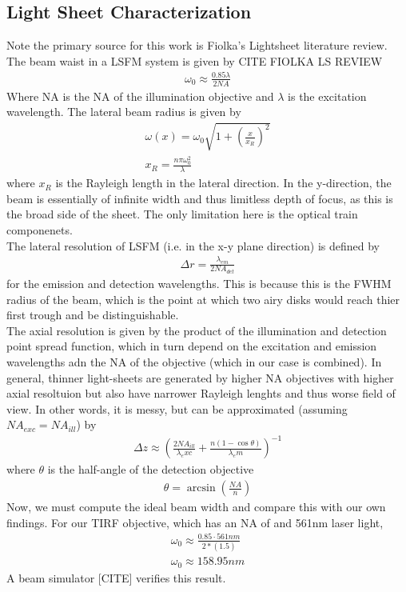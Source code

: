 \subsection{Light Sheet Characterization} %
Note the primary source for this work is Fiolka's Lightsheet literature review. The beam waist in a LSFM system is given by {CITE FIOLKA LS REVIEW} 
\begin{gather}
    \omega_0 \approx \frac{0.85 \lambda}{2 NA}
\end{gather}
    Where NA is the NA of the illumination objective and $\lambda$ is the excitation wavelength. The lateral beam radius is given by 
    \begin{gather}
        \omega(x) = \omega_0 \sqrt{1 + \left(\frac{x}{x_R}\right)^2}\\
        x_R = \frac{n \pi \omega_0^2}{\lambda}
    \end{gather}
    where $x_R$ is the Rayleigh length in the lateral direction.
    In the y-direction, the beam is essentially of infinite width and thus limitless depth of focus, as this is the broad side of the sheet. The only limitation here is the optical train componenets.\\
    The lateral resolution of LSFM (i.e. in the x-y plane direction) is defined by 
    \begin{gather}
        \Delta r = \frac{\lambda_{em}}{2 NA_{det}}
    \end{gather}
    for the emission and detection wavelengths. This is because this is the FWHM radius of the beam, which is the point at which two airy disks would reach thier first trough and be distinguishable.\\
    The axial resolution is given by the product of the illumination and detection point spread function, which in turn depend on the excitation and emission wavelengths adn the NA of the objective (which in our case is combined). In general, thinner light-sheets are generated by higher NA objectives with higher axial resoltuion but also have narrower Rayleigh lenghts and thus worse field of view. In other words, it is messy, but can be approximated (assuming $NA_{exc}=NA_{ill}$) by
    \begin{gather}
        \Delta z \approx \left( \frac{2 NA_{ill}}{\lambda_exc} + \frac{n (1-\cos \theta)}{\lambda_em}\right)^{-1}
    \end{gather}
    where $\theta$ is the half-angle of the detection objective
    \begin{gather}
        \theta = \arcsin\left(\frac{NA}{n}\right)
    \end{gather}
    Now, we must compute the ideal beam width and compare this with our own findings. For our TIRF objective, which has an NA of and 561nm laser light,
    \begin{gather}
        \omega_0 \approx \frac{0.85\cdot561nm}{2*(1.5)}\\
        \omega_0 \approx 158.95nm
    \end{gather}
A beam simulator [CITE] verifies this result.
\newpage 
